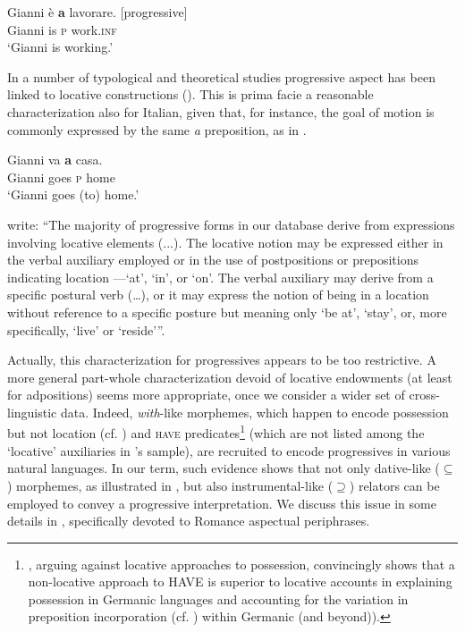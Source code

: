 \documentclass[output=paper,modfonts,nonflat,newtxmath,colorlinks,citecolor=brown]{langsci/langscibook}
\begin{document}
     \ex \label{ex:franco:10b}
    \gll Gianni è \textbf{a} lavorare.   \hfill [progressive]\\
        Gianni is \textsc{p} work.\textsc{inf}\\
    \glt ‘Gianni is working.’
    \z
    \z


In a number of typological and theoretical studies progressive aspect has been linked to locative constructions (\citealt{BybeeEtAl1994,MateuAmadas1999,DemirdacheUribe-Etxebarria1997}).  This is {prima facie} a reasonable characterization also for Italian, given that, for instance, the goal of motion is commonly expressed by the same \textit{a} preposition, as in .

\ea%
    \label{ex:franco:11}
    \gll  Gianni va \textbf{a} casa.\\
         Gianni goes \textsc{p} home\\
    \glt ‘Gianni goes (to) home.’
    \z

\citet[129--130]{BybeeEtAl1994} write: “The majority of progressive forms in our database derive from expressions involving locative elements (...). The locative notion may be expressed either in the verbal auxiliary employed or in the use of postpositions or prepositions indicating location —‘at’, ‘in’, or ‘on’. The verbal auxiliary may derive from a specific postural verb (…), or it may express the notion of being in a location without reference to a specific posture but meaning only ‘be at’, ‘stay’, or, more specifically, ‘live’ or ‘reside’”.

Actually, this characterization for progressives appears to be too restrictive. A more general part-whole characterization devoid of locative endowments (at least for adpositions) seems more appropriate, once we consider a wider set of cross-linguistic data. Indeed, \textit{with}{}-like morphemes, which happen to encode possession but not location (cf. \citealt{Levinson2011}) and \textsc{have} predicates\footnote{\citet{Levinson2011}, arguing against locative approaches to possession, convincingly shows that a non-locative approach to HAVE is superior to locative accounts in explaining possession in Germanic languages and accounting for the variation in preposition incorporation (cf. \citealt{Kayne1993, Harley2002}) within Germanic (and beyond)).} (which are not listed among the ‘locative’ auxiliaries in \citeauthor{BybeePerkinsPagliuca1994}’s sample), are recruited to encode progressives in various natural languages. In our term, such evidence shows that not only dative-like (${\subseteq}$) morphemes, as illustrated in , but also instrumental-like (${\supseteq}$) relators can be employed to convey a progressive interpretation. We discuss this issue in some details in , specifically devoted to Romance aspectual periphrases.
\end{document}
